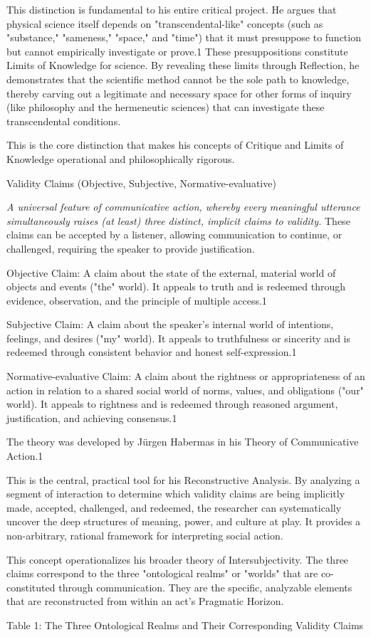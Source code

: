\documentclass{book}
\begin{document}
This distinction is fundamental to his entire critical project. He argues that physical science itself depends on "transcendental-like" concepts (such as "substance," "sameness," "space," and "time") that it must presuppose to function but cannot empirically investigate or prove.1 These presuppositions constitute Limits of Knowledge for science. By revealing these limits through Reflection, he demonstrates that the scientific method cannot be the sole path to knowledge, thereby carving out a legitimate and necessary space for other forms of inquiry (like philosophy and the hermeneutic sciences) that can investigate these transcendental conditions.

This is the core distinction that makes his concepts of Critique and Limits of Knowledge operational and philosophically rigorous.

\parencite{Carspecken2016}
Validity Claims (Objective, Subjective, Normative-evaluative)

\textit{A universal feature of communicative action, whereby every meaningful utterance simultaneously raises (at least) three distinct, implicit claims to validity.} These claims can be accepted by a listener, allowing communication to continue, or challenged, requiring the speaker to provide justification.

Objective Claim: A claim about the state of the external, material world of objects and events ("the" world). It appeals to truth and is redeemed through evidence, observation, and the principle of multiple access.1

Subjective Claim: A claim about the speaker's internal world of intentions, feelings, and desires ("my" world). It appeals to truthfulness or sincerity and is redeemed through consistent behavior and honest self-expression.1

Normative-evaluative Claim: A claim about the rightness or appropriateness of an action in relation to a shared social world of norms, values, and obligations ("our" world). It appeals to rightness and is redeemed through reasoned argument, justification, and achieving consensus.1

The theory was developed by Jürgen Habermas in his Theory of Communicative Action.1

This is the central, practical tool for his Reconstructive Analysis. By analyzing a segment of interaction to determine which validity claims are being implicitly made, accepted, challenged, and redeemed, the researcher can systematically uncover the deep structures of meaning, power, and culture at play. It provides a non-arbitrary, rational framework for interpreting social action.

This concept operationalizes his broader theory of Intersubjectivity. The three claims correspond to the three "ontological realms" or "worlds" that are co-constituted through communication. They are the specific, analyzable elements that are reconstructed from within an act's Pragmatic Horizon.

Table 1: The Three Ontological Realms and Their Corresponding Validity Claims

\parencite{Carspecken1995aa}



\printbibliography
\end{document}
